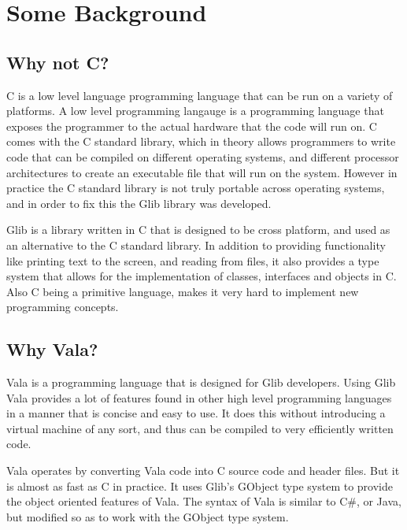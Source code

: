 \chapter{Some Background}

\section{Why not C?}

C is a low level language programming language that can be run on a variety of platforms. A low level programming langauge is a programming language that exposes the programmer to the actual hardware that the code will run on. C comes with the C standard library, which in theory allows programmers to write code that can be compiled on different operating systems, and different processor architectures to create an executable file that will run on the system. However in practice the C standard library is not truly portable across operating systems, and in order to fix this the Glib library was developed.

Glib is a library written in C that is designed to be cross platform, and used as an alternative to the C standard library. In addition to providing functionality like printing text to the screen, and reading from files, it also provides a type system that allows for the implementation of classes, interfaces and objects in C. Also C being a primitive language, makes it very hard to implement new programming concepts.

\section{Why Vala?}

Vala is a programming language that is designed for Glib developers. Using Glib Vala provides a lot of features found in other high level programming languages in a manner that is concise and easy to use. It does this without introducing a virtual machine of any sort, and thus can be compiled to very efficiently written code.

Vala operates by converting Vala code into C source code and header files. But it is almost as fast as C in practice. It uses Glib's GObject type system to provide the object oriented features of Vala. The syntax of Vala is similar to C\#, or Java, but modified so as to work with the GObject type system.

